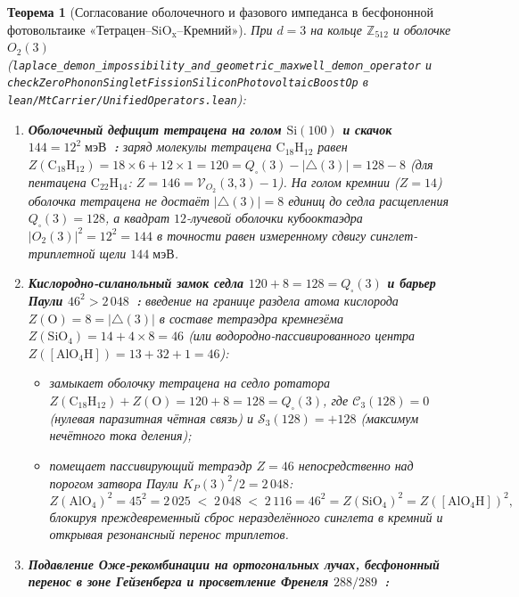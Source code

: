 \documentclass[11pt,a4paper]{article}
\theoremstyle{plain}
\newtheorem{theorem}{Теорема}[section]
\theoremstyle{definition}
\begin{document}
\begin{theorem}[Согласование оболочечного и фазового импеданса в бесфононной фотовольтаике «Тетрацен--$\mathrm{SiO_x}$--Кремний»]
\label{thm:solar-boost}
При $d=3$ на кольце $\mathbb{Z}_{512}$ и оболочке $O_2(3)$ (\texttt{laplace\_demon\_impossibility\_and\_geometric\_maxwell\_demon\_operator} и \texttt{checkZeroPhononSingletFissionSiliconPhotovoltaicBoostOp} в \texttt{lean/MtCarrier/UnifiedOperators.lean}):
\begin{enumerate}[label=\textbf{(\roman*)},leftmargin=*]
\item \textbf{Оболочечный дефицит тетрацена на голом $\mathrm{Si}(100)$ и скачок $144 = 12^2\;\text{мэВ}$~\cite{Klymenko2023}:}
  заряд молекулы тетрацена $\mathrm{C_{18}H_{12}}$ равен $Z(\mathrm{C_{18}H_{12}}) = 18\times 6 + 12\times 1 = 120 = Q_\square(3) - |{\triangle}(3)| = 128 - 8$ (для пентацена $\mathrm{C_{22}H_{14}}$: $Z = 146 = \mathcal{V}_{O_2}(3,3)-1$). На голом кремнии ($Z=14$) оболочка тетрацена не достаёт $|{\triangle}(3)|=8$ единиц до седла расщепления $Q_\square(3)=128$, а квадрат $12$-лучевой оболочки кубооктаэдра $|O_2(3)|^2 = 12^2 = 144$ в точности равен измеренному сдвигу синглет-триплетной щели $144\;\text{мэВ}$.
\item \textbf{Кислородно-силанольный замок седла $120 + 8 = 128 = Q_\square(3)$ и барьер Паули $46^2 > 2\,048$~\cite{Daiber2020,McNab2026}:}
  введение на границе раздела атома кислорода $Z(\mathrm{O}) = 8 = |{\triangle}(3)|$ в составе тетраэдра кремнезёма $Z(\mathrm{SiO_4}) = 14 + 4\times 8 = 46$ (или водородно-пассивированного центра $Z([\mathrm{AlO_4H}]) = 13 + 32 + 1 = 46$):
  \begin{itemize}[noitemsep]
  \item замыкает оболочку тетрацена на седло ротатора $Z(\mathrm{C_{18}H_{12}}) + Z(\mathrm{O}) = 120 + 8 = 128 = Q_\square(3)$, где $\mathcal{C}_3(128) = 0$ (нулевая паразитная чётная связь) и $\mathcal{S}_3(128) = +128$ (максимум нечётного тока деления);
  \item помещает пассивирующий тетраэдр $Z=46$ непосредственно над порогом затвора Паули $K_P(3)^2/2 = 2\,048$:
    \[
      Z(\mathrm{AlO_4})^2 = 45^2 = 2\,025 \;<\; 2\,048 \;<\; 2\,116 = 46^2 = Z(\mathrm{SiO_4})^2 = Z([\mathrm{AlO_4H}])^2,
    \]
    блокируя преждевременный сброс неразделённого синглета в кремний и открывая резонансный перенос триплетов.
  \end{itemize}
\item \textbf{Подавление Оже-рекомбинации на ортогональных лучах, бесфононный перенос в зоне Гейзенберга и просветление Френеля $288/289$~\cite{Benning2026}:}

\end{enumerate}
\end{theorem}
\end{document}

